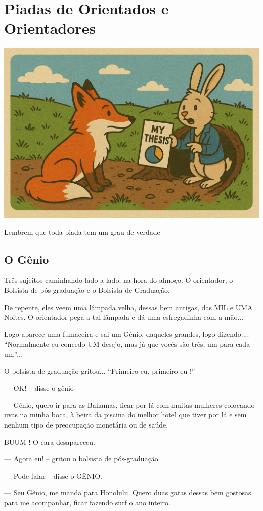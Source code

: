 	\chapter{Piadas de Orientados e Orientadores}

\begin{center}
\includegraphics[width=0.5\linewidth]{Images/coelho.png}    
\end{center}
\vspace{0.5cm}


Lembrem que toda piada tem um grau de verdade

\section{O Gênio }

Três sujeitos caminhando lado a lado, na hora do almoço. O orientador, o Bolsista de pós-graduação e o Bolsista de Graduação.

De repente, eles veem uma lâmpada velha, dessas bem antigas, das MIL e UMA Noites. O orientador pega a tal lâmpada e dá uma esfregadinha com a mão...

Logo aparece uma fumaceira e sai um Gênio, daqueles grandes, logo dizendo.... ``Normalmente eu concedo UM desejo, mas já que vocês são três, um para cada um''...

O bolsista de graduação gritou... ``Primeiro eu, primeiro eu !''

--- OK! -- disse o gênio

--- Gênio, quero ir para as Bahamas, ficar por lá com muitas mulheres colocando uvas na minha boca, à beira da piscina do melhor hotel que tiver por lá e sem nenhum tipo de preocupação monetária ou de saúde.

BUUM ! O cara desapareceu.

--- Agora eu! -- gritou o bolsista de pós-graduação

--- Pode falar -- disse o GÊNIO.

--- Seu Gênio, me manda para Honolulu. Quero duas gatas dessas bem gostosas para me acompanhar, ficar fazendo surf o ano inteiro.

